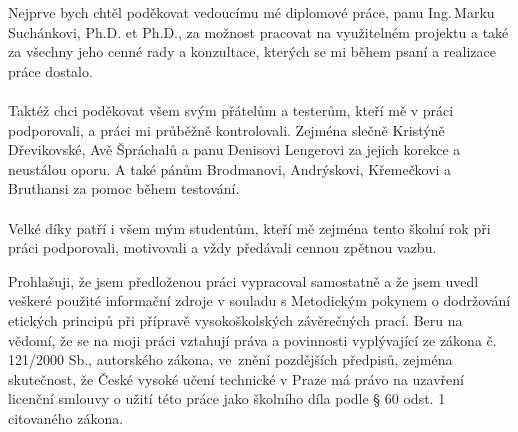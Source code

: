 \documentclass[czech,master,unicode,oneside]{ctufit-thesis}
\begin{document}
 
\frontmatter\frontmatterinit %
\thispagestyle{empty}\maketitle\thispagestyle{empty}\cleardoublepage %


\imprintpage %
\stopTOCentries

\begin{acknowledgmentpage}
    Nejprve bych chtěl poděkovat vedoucímu mé diplomové práce, panu Ing.\,Marku Suchánkovi, Ph.D. et Ph.D., za možnost pracovat na využitelném projektu a také za všechny jeho cenné rady a konzultace, kterých se mi během psaní a realizace práce dostalo.
\\\\
    Taktéž chci poděkovat všem svým přátelům a testerům, kteří mě v práci podporovali, a práci mi průběžně kontrolovali. Zejména slečně Kristýně Dřevikovské, Avě Špráchalů a panu Denisovi Lengerovi za jejich korekce a neustálou oporu. A také pánům
    Brodmanovi,
    Andrýskovi,
    Křemečkovi
    a
    Bruthansi 
    za pomoc během testování.
\\\\
    Velké díky patří i všem mým studentům, kteří mě zejména tento školní rok při práci podporovali, motivovali a vždy předávali cennou zpětnou vazbu. 
\end{acknowledgmentpage} 


\begin{declarationpage}
Prohlašuji, že jsem předloženou práci vypracoval samostatně a že jsem uvedl veškeré
použité informační zdroje v souladu s Metodickým pokynem o dodržování etických
principů při přípravě vysokoškolských závěrečných prací.
Beru na vědomí, že se na moji práci vztahují práva a povinnosti vyplývající ze zákona
č. 121/2000 Sb., autorského zákona, ve~znění pozdějších předpisů, zejména
skutečnost, že České vysoké učení technické v Praze má právo na uzavření licenční
smlouvy o užití této práce jako školního díla podle § 60 odst. 1 citovaného zákona.
\end{declarationpage}
\end{document}
